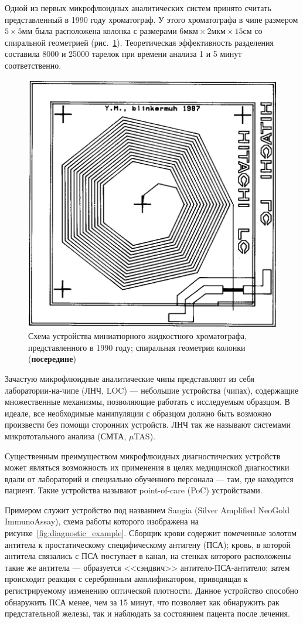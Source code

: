 \documentclass[oneside,final,12pt]{extreport}
\begin{document}
Одной из первых микрофлюидных аналитических систем принято считать
представленный в 1990 году хроматограф\cite{bib:early_chromatograph}.
У этого хроматографа в чипе размером $5\times5\text{мм}$ была
расположена
колонка с размерами
$6\text{мкм} \times 2\text{мкм} \times 15\text{см}$
со спиральной геометрией (рис.~\ref{fig:miniature_chromatograph_scheme}).
Теоретическая эффективность разделения составила 8000 и 25000 тарелок
при времени анализа 1 и 5 минут соответственно.

\begin{figure}
  \centering
  \includegraphics[width=.5\textwidth]{pic/miniature_chromatograph_scheme}

  \caption{%
    \label{fig:miniature_chromatograph_scheme}%
    Схема устройства миниатюрного жидкостного хроматографа, представленного в 1990 году;
    спиральная геометрия колонки (\textbf{посередине})
  }

\end{figure}

Зачастую микрофлюидные аналитические чипы представляют из себя
лаборатории-на-чипе (ЛНЧ, LOC) ---
небольшие устройства (чипах), содержащие
множественные механизмы, позволяющие работать с исследуемым образцом.
В идеале, все необходимые манипуляции с образцом должно быть возможно произвести
без помощи сторонних устройств.
ЛНЧ так же называют системами микрототального анализа (СМТА, $\mu$TAS).

Существенным преимуществом микрофлюидных диагностических устройств
может являться возможность их применения в целях медицинской диагностики
вдали от лабораторий и специально обученного персонала --- там,
где находится пациент.
Такие устройства называют point-of-care (PoC) устройствами\cite{bib:PoC_trends}.

Примером служит устройство под названием
Sangia (Silver Amplified NeoGold ImmunoAssay)\cite{bib:poc_rsa},
схема работы которого изображена на рисунке~\ref{fig:diagnostic_example}.
Сборщик крови содержит помеченные золотом антитела
к простатическому специфическому антигену (ПСА);
кровь, в которой антитела связались с ПСА поступает в канал,
на стенках которого расположены такие же антитела ---
образуется <<сэндвич>> антитело-ПСА-антитело;
затем происходит реакция с серебрянным амплификатором,
приводящая к регистрируемому изменению оптической плотности.
Данное устройство способно обнаружить ПСА менее, чем за 15 минут,
что позволяет как обнаружить рак предстательной железы,
так и наблюдать за состоянием пацента после лечения.
\end{document}
